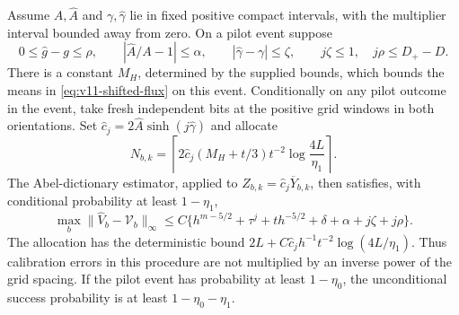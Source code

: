 \begin{theorem}
\label{thm:v11-plug-in}
Assume $A,\widehat A$ and $\gamma,\widehat\gamma$ lie in fixed
positive compact intervals, with the multiplier interval bounded away
from zero. On a pilot event suppose
\[
 0\le\widehat g-g\le\rho,\qquad
 |\widehat A/A-1|\le\alpha,\qquad
 |\widehat\gamma-\gamma|\le\zeta,
 \qquad j\zeta\le1,\quad j\rho\le D_+-D.
\]
There is a constant $M_H$, determined by the supplied bounds, which
bounds the means in \eqref{eq:v11-shifted-flux} on this event.
Conditionally on any pilot outcome in the event, take fresh independent
bits at the positive grid windows in both orientations. Set
$\widehat c_j=2\widehat A\sinh(j\widehat\gamma)$ and allocate
\begin{equation}\label{eq:v11-plugin-allocation}
 N_{b,k}=\left\lceil
       2\widehat c_j(M_H+t/3)t^{-2}\log\frac{4L}{\eta_1}
                                    \right\rceil.
\end{equation}
The Abel-dictionary estimator, applied to
$Z_{b,k}=\widehat c_j\overline Y_{b,k}$, then satisfies, with
conditional probability at least $1-\eta_1$,
\begin{equation}\label{eq:v11-plugin-error}
 \max_b\|\widehat V_b-\mathcal V_b\|_\infty
 \le C\{h^{m-5/2}+\tau^j+t h^{-5/2}+\delta
                           +\alpha+j\zeta+j\rho\}.
\end{equation}
The allocation has the deterministic bound
$2L+C\widehat c_jh^{-1}t^{-2}\log(4L/\eta_1)$.
Thus calibration errors in this procedure are not multiplied by an
inverse power of the grid spacing. If the pilot event has probability
at least $1-\eta_0$, the unconditional success probability is at
least $1-\eta_0-\eta_1$.
\end{theorem}
